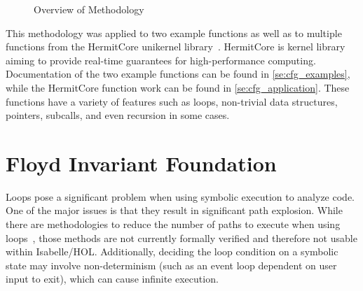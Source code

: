 \begin{figure}
  \centering
  \caption{Overview of Methodology}\label{fig:cfg_overview}
\end{figure}

This methodology was applied to two example functions
as well as to multiple functions
from the HermitCore unikernel library~\citep{lankes2016hermitcore}.
HermitCore is  kernel library aiming to provide real-time guarantees for high-performance computing.
Documentation of the two example functions can be found in \cref{se:cfg_examples},
while the HermitCore function work can be found in \cref{se:cfg_application}.
These functions have a variety of features such as loops,
non-trivial data structures, pointers, subcalls, and even recursion in some cases.

\section{Floyd Invariant Foundation}\label{se:cfg_invariant}
Loops pose a significant problem when using symbolic execution to analyze code.
One of the major issues is that they result in significant path explosion.
While there are methodologies to reduce the number of paths to execute
when using loops~\citep{saxena2009lese,obdrzalek2011efficient},
those methods are not currently formally verified
and therefore not usable within Isabelle/HOL.
Additionally, deciding the loop condition on a symbolic state
may involve non-determinism (such as an event loop dependent on user input to exit),
which can cause infinite execution.

